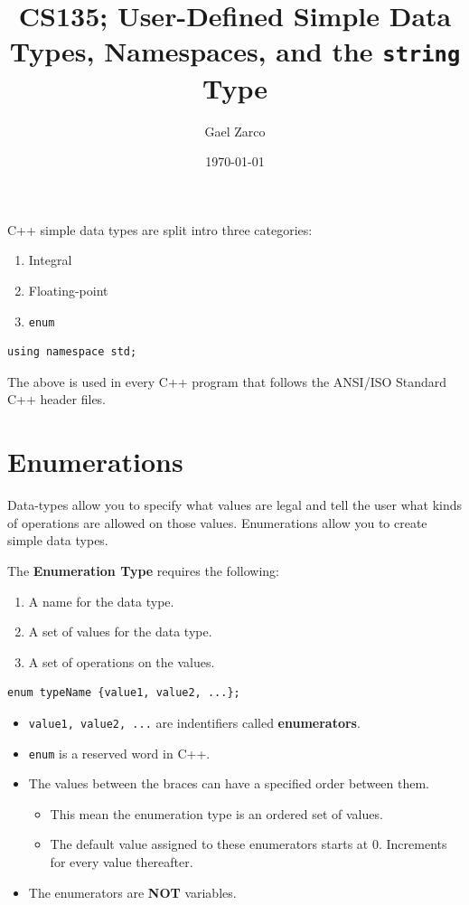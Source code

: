 \documentclass{article}
\title{CS135; User-Defined Simple Data Types, Namespaces, and the
\texttt{string} Type}
\author{Gael Zarco}
\date{\today}
\begin{document}
\maketitle

C++ simple data types are split intro three categories:
\begin{enumerate}
  \item Integral
  \item Floating-point
  \item \texttt{enum}
\end{enumerate}

\begin{lstlisting}[caption={\texttt{namespace} Example}]
 using namespace std;
\end{lstlisting}

The above is used in every C++ program that follows the ANSI/ISO Standard C++
header files.

\section{Enumerations}
Data-types allow you to specify what values are legal and tell the user what
kinds of operations are allowed on those values. Enumerations allow you to
create simple data types.

\vspace{8pt}
The \textbf{Enumeration Type} requires the following:
\begin{enumerate}
  \item A name for the data type.
  \item A set of values for the data type.
  \item A set of operations on the values.
\end{enumerate}

\begin{lstlisting}[caption={Enumeration Syntax}]
  enum typeName {value1, value2, ...};
\end{lstlisting}

\begin{itemize}
  \item \texttt{value1, value2, ...} are indentifiers called
    \textbf{enumerators}.
  \item \texttt{enum} is a reserved word in C++.
  \item The values between the braces can have a specified order between them.
    \begin{itemize}
      \item This mean the enumeration type is an ordered set of values.
      \item The default value assigned to these enumerators starts at 0.
        Increments for every value thereafter.
    \end{itemize}
  \item The enumerators are \textbf{NOT} variables.
\end{itemize}
\end{document}
